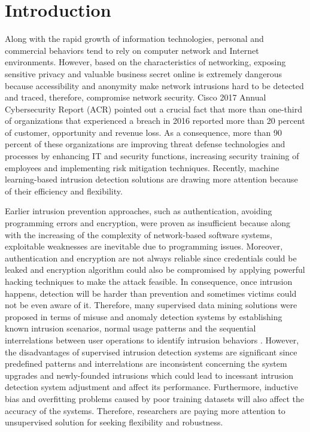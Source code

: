 \documentclass[conference]{IEEEtran}
\begin{document}
\section{Introduction}
Along with the rapid growth of information technologies, personal and commercial behaviors tend to rely on computer network and Internet environments. However, based on the characteristics of networking, exposing sensitive privacy and valuable business secret online is extremely dangerous because accessibility and anonymity make network intrusions hard to be detected and traced, therefore, compromise network security. Cisco 2017 Annual Cybersecurity Report (ACR) \cite{Cisco2017} pointed out a crucial fact that more than one-third of organizations that experienced a breach in 2016 reported more than 20 percent of customer, opportunity and revenue loss. As a consequence, more than 90 percent of these organizations are improving threat defense technologies and processes by enhancing IT and security functions, increasing security training of employees and implementing risk mitigation techniques. Recently, machine learning-based intrusion detection solutions \cite{Buczak2016}\cite{Ashfaq2017} are drawing more attention because of their efficiency and flexibility. 

Earlier intrusion prevention approaches, such as authentication, avoiding programming errors and encryption, were proven as insufficient because along with the increasing of the complexity of network-based software systems, exploitable weaknesses are inevitable due to programming issues. Moreover, authentication and encryption are not always reliable since credentials could be leaked and encryption algorithm could also be compromised by applying powerful hacking techniques to make the attack feasible. In consequence, once intrusion happens, detection will be harder than prevention and sometimes victims could not be even aware of it. Therefore, many supervised data mining solutions were proposed in terms of misuse and anomaly detection systems by establishing known intrusion scenarios, normal usage patterns and the sequential interrelations between user operations to identify intrusion behaviors \cite{Lee1998}. However, the disadvantages of supervised intrusion detection systems are significant since predefined patterns and interrelations are inconsistent concerning the system upgrades and newly-founded intrusions which could lead to incessant intrusion detection system adjustment and affect its performance. Furthermore, inductive bias and overfitting problems caused by poor training datasets will also affect the accuracy of the systems. Therefore, researchers are paying more attention to unsupervised solution \cite{Bouguila2011}\cite{Azam2015} for seeking flexibility and robustness.
\end{document}
